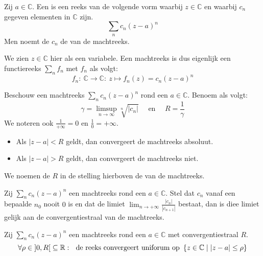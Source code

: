 \documentclass[main.tex]{subfiles}
\begin{document}
\begin{de}
  Zij $a \in \mathbb{C}$.
  Een  is een reeks van de volgende vorm waarbij $z\in\mathbb{C}$ en waarbij $c_{n}$ gegeven elementen in $\mathbb{C}$ zijn.
  \[ \sum_{n}c_{n}(z-a)^{n} \]
  Men noemt de $c_{n}$ de  van de machtreeks.
\end{de}

\begin{opm}
  We zien $z \in \mathbb{C}$ hier als een variabele.
  Een machtreeks is dus eigenlijk een functiereeks $\sum_{n}f_{n}$ met $f_{n}$ als volgt:
  \[ f_{n}:\ \mathbb{C} \rightarrow \mathbb{C}:\ z \mapsto f_{n}(z) = c_{n}(z-a)^{n} \]
\end{opm}

\begin{bst}
  Beschouw een machtreeks $\sum_{n}c_{n}(z-a)^{n}$ rond een $a\in \mathbb{C}$.
  Benoem als volgt:
  \[ \gamma = \limsup_{n \rightarrow \infty}\sqrt[n]{|c_{n}|} \quad\text{ en }\quad R = \frac{1}{\gamma} \]
  We noteren ook $\frac{1}{+\infty}=0$ en $\frac{1}{0} = +\infty$.
  \begin{itemize}
  \item Als $|z-a| < R$ geldt, dan convergeert de machtreeks absoluut.
  \item Als $|z-a| > R$ geldt, dan convergeert de machtreeks niet.
  \end{itemize}
\end{bst}


\begin{de}
  We noemen de $R$ in de stelling hierboven de  van de machtreeks.
\end{de}


\begin{bpr}
  Zij $\sum_{n}c_{n}(z-a)^{n}$ een machtreeks rond een $a\in \mathbb{C}$.
  Stel dat $c_{n}$ vanaf een bepaalde $n_{0}$ nooit $0$ is en dat de limiet $\lim_{n \rightarrow +\infty}\frac{|c_{n}|}{|c_{n+1}|}$ bestaat, dan is diee limiet gelijk aan de convergentiestraal van de machtreeks.
\end{bpr}


\begin{bst}
  Zij $\sum_{n}c_{n}(z-a)^{n}$ een machtreeks rond een $a\in \mathbb{C}$ met convergentiestraal $R$.
  \[ \forall \rho \in \interval[open]{0}{R} \subseteq \mathbb{R}:\ \text{ de reeks convergeert uniforum op } \left\{ z \in \mathbb{C} \mid |z-a| \le \rho \right\} \]
\end{bst}
\end{document}
